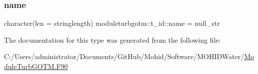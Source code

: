 \mbox{\label{structmoduleturbgotm_1_1t__id_ae9c0ad3170d08bf69d9c896ad478aa34}} 
\subsubsection{\texorpdfstring{name}{name}}
{\footnotesize\ttfamily character(len = stringlength) moduleturbgotm\+::t\+\_\+id\+::name = null\+\_\+str\hspace{0.3cm}{\ttfamily [private]}}



The documentation for this type was generated from the following file\+:\begin{DoxyCompactItemize}
\item 
C\+:/\+Users/administrator/\+Documents/\+Git\+Hub/\+Mohid/\+Software/\+M\+O\+H\+I\+D\+Water/\mbox{\hyperlink{_module_turb_g_o_t_m_8_f90}{Module\+Turb\+G\+O\+T\+M.\+F90}}\end{DoxyCompactItemize}
